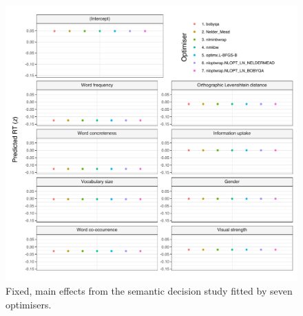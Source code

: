 \documentclass[
  12pt,
  man,floatsintext]{apa7}
\begin{document}
\begin{figure}

{\centering \includegraphics[width=1\linewidth]{../semanticdecision/frequentist_analysis/model_diagnostics/plots/main_effects_semanticdecision_allFit_convergence} 

}

\caption{Fixed, main effects from the semantic decision study fitted by seven optimisers.}\label{fig:main-effects-semanticdecision-allFit-convergence}
\end{figure}
\end{document}
